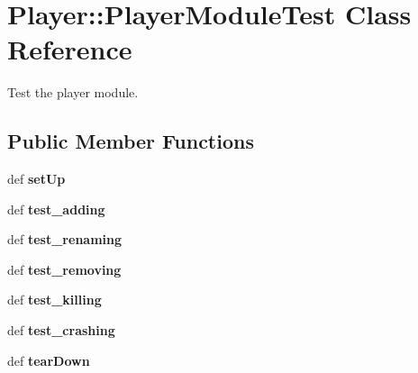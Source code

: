 \hypertarget{class_player_1_1_player_module_test}{
\section{\-Player\-:\-:\-Player\-Module\-Test \-Class \-Reference}
\label{class_player_1_1_player_module_test}
}


\-Test the player module.  


\subsection*{\-Public \-Member \-Functions}
\begin{DoxyCompactItemize}
\item 
\hypertarget{class_player_1_1_player_module_test_a17ac4447e9cbbc8794f1fcb248e6b372}{
def {\bfseries set\-Up}}
\label{class_player_1_1_player_module_test_a17ac4447e9cbbc8794f1fcb248e6b372}

\item 
\hypertarget{class_player_1_1_player_module_test_a468eb87a68890ee095394d578972883c}{
def {\bfseries test\-\_\-adding}}
\label{class_player_1_1_player_module_test_a468eb87a68890ee095394d578972883c}

\item 
\hypertarget{class_player_1_1_player_module_test_a7eb169fc9b707bd6e69ae602956e16eb}{
def {\bfseries test\-\_\-renaming}}
\label{class_player_1_1_player_module_test_a7eb169fc9b707bd6e69ae602956e16eb}

\item 
\hypertarget{class_player_1_1_player_module_test_a2155dac82b690a0d7462907bf2dc2f7e}{
def {\bfseries test\-\_\-removing}}
\label{class_player_1_1_player_module_test_a2155dac82b690a0d7462907bf2dc2f7e}

\item 
\hypertarget{class_player_1_1_player_module_test_a5056f71e29a083425c787b682968638f}{
def {\bfseries test\-\_\-killing}}
\label{class_player_1_1_player_module_test_a5056f71e29a083425c787b682968638f}

\item 
\hypertarget{class_player_1_1_player_module_test_aa73d12af07d73f377def08dd926e7c96}{
def {\bfseries test\-\_\-crashing}}
\label{class_player_1_1_player_module_test_aa73d12af07d73f377def08dd926e7c96}

\item 
\hypertarget{class_player_1_1_player_module_test_a38fd7bd5d108e3fe4aa5b0c4fb833eb4}{
def {\bfseries tear\-Down}}
\label{class_player_1_1_player_module_test_a38fd7bd5d108e3fe4aa5b0c4fb833eb4}

\end{DoxyCompactItemize}
